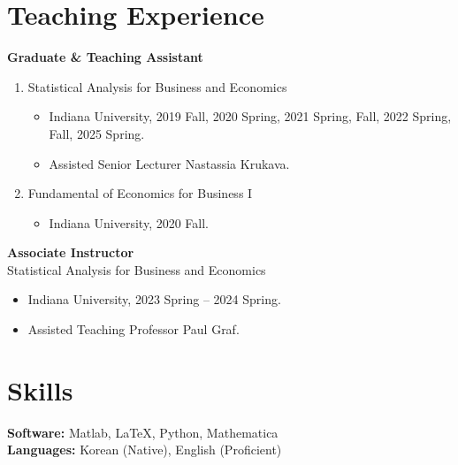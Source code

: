 \documentclass[11pt,a4paper]{article}
\begin{document}
\section*{Teaching Experience}
\textbf{Graduate \& Teaching Assistant} 
\begin{enumerate}[leftmargin=*]   
\item Statistical Analysis for Business and Economics
    \begin{itemize}[leftmargin=*]
        \item Indiana University, 2019 Fall, 2020 Spring, 2021 Spring, Fall, 2022 Spring, Fall, 2025 Spring.
        \item Assisted Senior Lecturer Nastassia Krukava.
    \end{itemize}    
\item Fundamental of Economics for Business I
    \begin{itemize}[leftmargin=*]
        \item Indiana University, 2020 Fall.
    \end{itemize}
\end{enumerate}

\textbf{Associate Instructor}\\
Statistical Analysis for Business and Economics
\begin{itemize}
    \item Indiana University, 2023 Spring -- 2024 Spring.
    \item Assisted Teaching Professor Paul Graf.
\end{itemize}


\section*{Skills}
\textbf{Software:} Matlab, LaTeX, Python, Mathematica \\
\textbf{Languages:} Korean (Native), English (Proficient)
\end{document}

